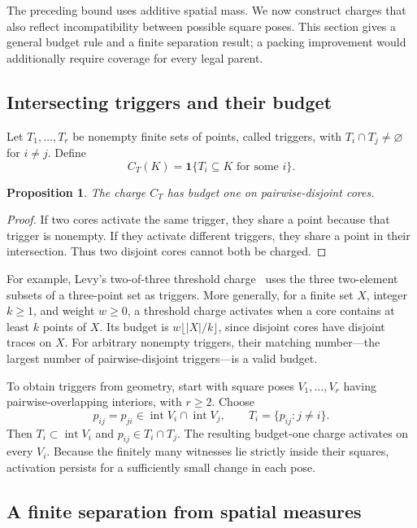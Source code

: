 \documentclass[11pt]{article}
\newtheorem{proposition}[theorem]{Proposition}
\newcommand{\interior}{\operatorname{int}}
\newcommand{\ind}{\mathbf 1}
\begin{document}
The preceding bound uses additive spatial mass. We now construct charges that
also reflect incompatibility between possible square poses. This section gives
a general budget rule and a finite separation result; a packing improvement
would additionally require coverage for every legal parent.

\subsection{Intersecting triggers and their budget}

Let $T_1,\ldots,T_r$ be nonempty finite sets of points, called triggers, with
$T_i\cap T_j\ne\varnothing$ for $i\ne j$. Define
\[
  C_T(K)=\ind\{T_i\subseteq K\text{ for some }i\}.
\]

\begin{proposition}\label{prop:trigger}
The charge $C_T$ has budget one on pairwise-disjoint cores.
\end{proposition}

\begin{proof}
If two cores activate the same trigger, they share a point because that
trigger is nonempty. If they activate different triggers, they share a point
in their intersection. Thus two disjoint cores cannot both be charged.
\end{proof}

For example, Levy's two-of-three threshold charge~\cite{Levy} uses the three
two-element subsets of a three-point set as triggers. More generally, for a
finite set $X$, integer $k\ge1$, and weight $w\ge0$, a threshold charge
activates when a core contains at least $k$ points of $X$. Its budget is
$w\lfloor |X|/k\rfloor$, since disjoint cores have disjoint traces on $X$.
For arbitrary nonempty triggers, their matching number---the largest number
of pairwise-disjoint triggers---is a valid budget.

To obtain triggers from geometry, start with square poses
$V_1,\ldots,V_r$ having pairwise-overlapping interiors, with $r\ge2$. Choose
\[
  p_{ij}=p_{ji}\in\interior V_i\cap\interior V_j,
  \qquad T_i=\{p_{ij}:j\ne i\}.
\]
Then $T_i\subset\interior V_i$ and $p_{ij}\in T_i\cap T_j$. The resulting
budget-one charge activates on every $V_i$. Because the finitely many
witnesses lie strictly inside their squares, activation persists for a
sufficiently small change in each pose.

\subsection{A finite separation from spatial measures}
\end{document}
